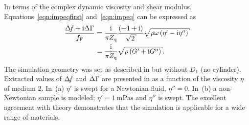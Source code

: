 In terms of the complex dynamic viscosity and shear modulus,
Equations~\ref{eqn:impeqfirst} and~\ref{eqn:impeq} can be expressed as
\begin{align}
  \frac{\df+\mi\Delta\Gamma}{f_{\mathrm{F}}} & =\frac{\mi}{\pi Z_{\mathrm{q}}}
  \frac{\left(-1+\mi\right)}{\sqrt{2}}\sqrt{\rho\omega\left(\eta'-\mi\eta''\right)}                               \\
                                             & =\frac{\mi}{\pi Z_{\mathrm{q}}}\sqrt{\rho\left(G'+\mi G''\right)}.
  \label{eqn:viscoshear}
\end{align}
The simulation geometry was set as described in 
but without $D_1$ (no cylinder).  Extracted values of $\Delta\!f$ and $\Delta\Gamma$ are
presented in  as a function of the viscosity $\eta$
of medium 2.  In \,(a) $\eta'$ is swept for a
Newtonian fluid, $\eta''=0$.  In \,(b) a non-Newtonian
sample is modeled; $\eta'=\SI{1}{\milli\pascal\second}$ and $\eta''$ is
swept.  The excellent agreement with theory demonstrates that the
simulation is applicable for a wide range of materials.

